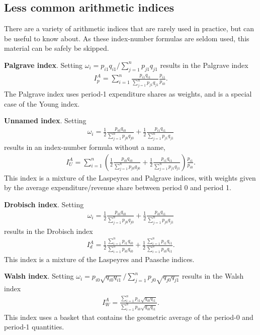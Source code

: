 \documentclass[
]{article}
\begin{document}
\hypertarget{less-common-arithmetic-indices}{%
\subsection{Less common arithmetic indices}\label{less-common-arithmetic-indices}}

There are a variety of arithmetic indices that are rarely used in practice, but can be useful to know about. As these index-number formulas are seldom used, this material can be safely be skipped.

\textbf{Palgrave index}. Setting \(\omega_{i} = p_{i1} q_{i1} / \sum_{j = 1}^{n} p_{j1} q_{j1}\) results in the Palgrave index
\begin{align*}
I^{A}_{p} = \sum_{i = 1}^{n} \frac{p_{i1} q_{i1}}{\sum_{j = 1}^{n} p_{j1} q_{j1}} \frac{p_{i1}}{p_{i0}}.
\end{align*}
The Palgrave index uses period-1 expenditure shares as weights, and is a special case of the Young index.

\textbf{Unnamed index}. Setting
\begin{align*}
\omega_{i} = \frac{1}{2} \frac{p_{i0} q_{i0}}{\sum_{j = 1}^{n} p_{j0} q_{j0}} + \frac{1}{2} \frac{p_{i1} q_{i1}}{\sum_{j = 1}^{n} p_{j1} q_{j1}}
\end{align*}
results in an index-number formula without a name,
\begin{align*}
I^{A}_{U} = \sum_{i = 1}^{n} \left(\frac{1}{2} \frac{p_{i0} q_{i0}}{\sum_{j = 1}^{n} p_{j0} q_{j0}} + \frac{1}{2} \frac{p_{i1} q_{i1}}{\sum_{j = 1}^{n} p_{j1} q_{j1}}\right) \frac{p_{i1}}{p_{i0}}.
\end{align*}
This index is a mixture of the Laspeyres and Palgrave indices, with weights given by the average expenditure/revenue share between period 0 and period 1.

\textbf{Drobisch index}. Setting
\begin{align*}
\omega_{i} = \frac{1}{2} \frac{p_{i0} q_{i0}}{\sum_{j = 1}^{n} p_{j0} q_{j0}} + \frac{1}{2} \frac{p_{i0} q_{i1}}{\sum_{j = 1}^{n} p_{j0} q_{j1}}
\end{align*}
results in the Drobisch index
\begin{align*}
I^{A}_{d} = \frac{1}{2} \frac{\sum_{i = 1}^{n} p_{i1} q_{i0}}{\sum_{i = 1}^{n} p_{i0} q_{i0}} + \frac{1}{2} \frac{\sum_{i = 1}^{n} p_{i1} q_{i1}}{\sum_{i = 1}^{n} p_{i0} q_{i1}}.
\end{align*}
This index is a mixture of the Laspeyres and Paasche indices.

\textbf{Walsh index}. Setting \(\omega_{i} = p_{i0} \sqrt{q_{i0} q_{i1}} / \sum_{j = 1}^{n} p_{j0} \sqrt{q_{j0} q_{j1}}\) results in the Walsh index
\begin{align*}
I^{A}_{W} = \frac{\sum_{i = 1}^{n} p_{i1} \sqrt{q_{i0} q_{i1}}}{\sum_{i = 1}^{n} p_{i0} \sqrt{q_{i0} q_{i1}}}.
\end{align*}
This index uses a basket that contains the geometric average of the period-0 and period-1 quantities.
\end{document}
